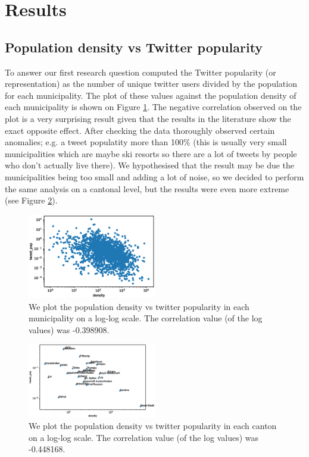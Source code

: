 \section{Results}

\subsection{Population density vs Twitter popularity}

To answer our first research question computed the Twitter popularity (or representation) as the number of unique twitter users divided by the population for each municipality. The plot of these values against the population density of 
each municipality is shown on Figure \ref{mun_pop}. The negative correlation observed on the plot is a very surprising result given that the results in the literature show the exact opposite effect. After checking the data thoroughly observed certain anomalies; e.g. a tweet populatity more than 100\% (this is usually very small municipalities which are maybe ski resorts so there are a lot of tweets by people who don't actually live there). We hypothesised that the result may be due the municipalities being too small and adding a lot of noise, so we decided to perform the same analysis on a cantonal level, but the results were even more extreme (see Figure \ref{can_pop}).

\begin{figure}[h]
  \includegraphics[width=0.5\textwidth]{images/mun_density_pop.eps}
  \caption{We plot the population density vs twitter popularity in each municipality on a log-log scale. The correlation value (of the log values) was -0.398908.}
  \label{mun_pop}
\end{figure}


\begin{figure}[h]
  \includegraphics[width=0.5\textwidth]{images/can_density_pop.eps}
  \caption{We plot the population density vs twitter popularity in each canton on a log-log scale. The correlation value (of the log values) was -0.448168.}
  \label{can_pop}
\end{figure}



